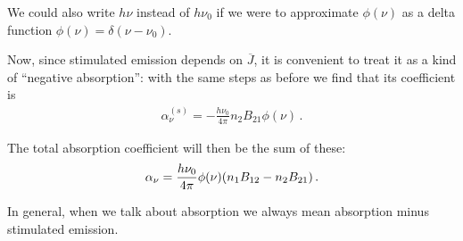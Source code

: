 \documentclass[main.tex]{subfiles}
\begin{document}
We could also write \(h \nu\) instead of \(h \nu_0\) if we were to approximate \(\phi (\nu )\)  as a delta function \(\phi (\nu ) = \delta (\nu - \nu_0 )\).

Now, since stimulated emission depends on \(\overline{J}\), it is convenient to treat it as a kind of ``negative absorption'': with the same steps as before we find that its coefficient is 
%
\begin{align}
\alpha_\nu^{(s)} = - \frac{h \nu_0 }{4 \pi } n_2 B_{21} \phi (\nu ) 
\,.
\end{align}

The total absorption coefficient will then be the sum of these: 
%
\begin{align}
\alpha _\nu = \frac{h \nu_0 }{4 \pi } \phi (\nu ) \qty(n_1 B_{12} - n_2 B_{21} )
\,.
\end{align}

In general, when we talk about absorption we always mean absorption minus stimulated emission. 
\end{document}
